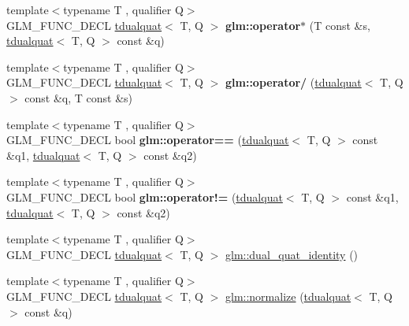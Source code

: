 \begin{DoxyCompactItemize}
{\footnotesize template$<$typename T , qualifier Q$>$ }\\G\+L\+M\+\_\+\+F\+U\+N\+C\+\_\+\+D\+E\+CL \hyperlink{structglm_1_1tdualquat}{tdualquat}$<$ T, Q $>$ {\bfseries glm\+::operator$\ast$} (T const \&s, \hyperlink{structglm_1_1tdualquat}{tdualquat}$<$ T, Q $>$ const \&q)
\item 
\mbox{\label{group__gtx__dual__quaternion_gaac31fa68a57186cd22388eb385ca115d}} 
{\footnotesize template$<$typename T , qualifier Q$>$ }\\G\+L\+M\+\_\+\+F\+U\+N\+C\+\_\+\+D\+E\+CL \hyperlink{structglm_1_1tdualquat}{tdualquat}$<$ T, Q $>$ {\bfseries glm\+::operator/} (\hyperlink{structglm_1_1tdualquat}{tdualquat}$<$ T, Q $>$ const \&q, T const \&s)
\item 
\mbox{\label{group__gtx__dual__quaternion_ga82faf668287e9ca3c9751d873a85970d}} 
{\footnotesize template$<$typename T , qualifier Q$>$ }\\G\+L\+M\+\_\+\+F\+U\+N\+C\+\_\+\+D\+E\+CL bool {\bfseries glm\+::operator==} (\hyperlink{structglm_1_1tdualquat}{tdualquat}$<$ T, Q $>$ const \&q1, \hyperlink{structglm_1_1tdualquat}{tdualquat}$<$ T, Q $>$ const \&q2)
\item 
\mbox{\label{group__gtx__dual__quaternion_ga41964adca31c6e6b52f1367104d15646}} 
{\footnotesize template$<$typename T , qualifier Q$>$ }\\G\+L\+M\+\_\+\+F\+U\+N\+C\+\_\+\+D\+E\+CL bool {\bfseries glm\+::operator!=} (\hyperlink{structglm_1_1tdualquat}{tdualquat}$<$ T, Q $>$ const \&q1, \hyperlink{structglm_1_1tdualquat}{tdualquat}$<$ T, Q $>$ const \&q2)
\item 
{\footnotesize template$<$typename T , qualifier Q$>$ }\\G\+L\+M\+\_\+\+F\+U\+N\+C\+\_\+\+D\+E\+CL \hyperlink{structglm_1_1tdualquat}{tdualquat}$<$ T, Q $>$ \hyperlink{group__gtx__dual__quaternion_ga0b35c0e30df8a875dbaa751e0bd800e0}{glm\+::dual\+\_\+quat\+\_\+identity} ()
\item 
{\footnotesize template$<$typename T , qualifier Q$>$ }\\G\+L\+M\+\_\+\+F\+U\+N\+C\+\_\+\+D\+E\+CL \hyperlink{structglm_1_1tdualquat}{tdualquat}$<$ T, Q $>$ \hyperlink{group__gtx__dual__quaternion_ga299b8641509606b1958ffa104a162cfe}{glm\+::normalize} (\hyperlink{structglm_1_1tdualquat}{tdualquat}$<$ T, Q $>$ const \&q)

\end{DoxyCompactItemize}
